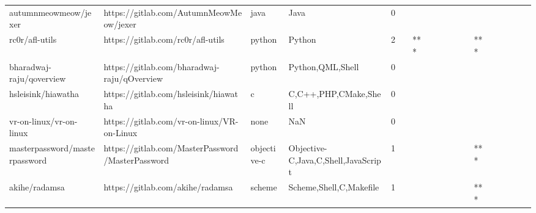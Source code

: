\begin{tabular}{llllrlllllllllllll}
autumnmeowmeow/jexer                               &            https://gitlab.com/AutumnMeowMeow/jexer &              java &                                               Java &       0 &         &        &           &                &                 &        &           &           &          &          &       &              &          \\
rc0r/afl-utils                                     &                  https://gitlab.com/rc0r/afl-utils &            python &                                             Python &       2 &         &    *** &           &                &                 &        &           &       *** &          &          &       &              &          \\
bharadwaj-raju/qoverview                           &        https://gitlab.com/bharadwaj-raju/qOverview &            python &                                   Python,QML,Shell &       0 &         &        &           &                &                 &        &           &           &          &          &       &              &          \\
hsleisink/hiawatha                                 &              https://gitlab.com/hsleisink/hiawatha &                 c &                              C,C++,PHP,CMake,Shell &       0 &         &        &           &                &                 &        &           &           &          &          &       &              &          \\
vr-on-linux/vr-on-linux                            &         https://gitlab.com/vr-on-linux/VR-on-Linux &              none &                                                NaN &       0 &         &        &           &                &                 &        &           &           &          &          &       &              &          \\
masterpassword/masterpassword                      &   https://gitlab.com/MasterPassword/MasterPassword &       objective-c &                Objective-C,Java,C,Shell,JavaScript &       1 &         &        &           &                &                 &        &           &       *** &          &          &       &              &          \\
akihe/radamsa                                      &                   https://gitlab.com/akihe/radamsa &            scheme &                            Scheme,Shell,C,Makefile &       1 &         &        &           &                &                 &        &           &       *** &          &          &       &              &          \\

\end{tabular}
